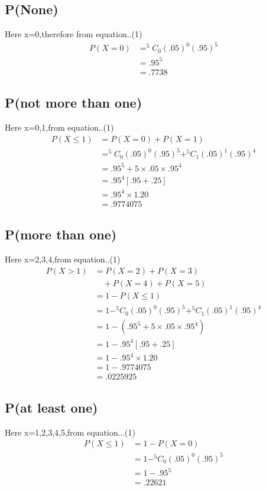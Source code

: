\documentclass[11pt,a4paper,twocolumn]{article}
\begin{document}
\begin{flushleft}
\section{P(None)}Here x=0,therefore from equation..(1)
\begin{align*}
P(X=0)&=^{5}C_0(.05)^{0}(.95)^{5}\\
&=.95^{5}\\
&=.7738
\end{align*}
\end{flushleft}
\begin{flushleft}
\section{P(not more than one)}
Here x=0,1,from equation..(1)
\begin{align*}
P(X\leq1)&=P(X=0)+P(X=1)\\
&=^{5}C_0(.05)^{0}(.95)^{5}+^{5}C_1(.05)^{1}(.95)^{4}\\
&=.95^{5}+5\times.05\times.95^4\\
&=.95^{4}[.95+.25]\\
&=.95^{4}\times1.20\\
&=.9774075
\end{align*}
\end{flushleft}
\begin{flushleft}
\section{P(more than one)}
Here x=2,3,4,from equation..(1)
\begin{align*}
P(X>1)&=P(X=2)+P(X=3)\\
&\quad+P(X=4)+P(X=5)\\
&=1-P(X\leq1)\\
&=1-^{5}C_0(.05)^{0}(.95)^{5}+^{5}C_1(.05)^{1}(.95)^{4}\\
&=1-(.95^{5}+5\times.05\times.95^4)\\
&=1-.95^{4}[.95+.25]\\
&=1-.95^{4}\times1.20\\
&=1-.9774075\\
&=.0225925
\end{align*}
\end{flushleft}
\begin{flushleft}
\section{P(at least one)}
Here x=1,2,3,4,5,from equation...(1)
\begin{align*}
P(X\leq1)&=1-P(X=0)\\
&=1-^{5}C_0(.05)^{0}(.95)^{5}\\
&=1-.95^{5}\\
&=.22621
\end{align*}
\end{flushleft}
\end{document}
